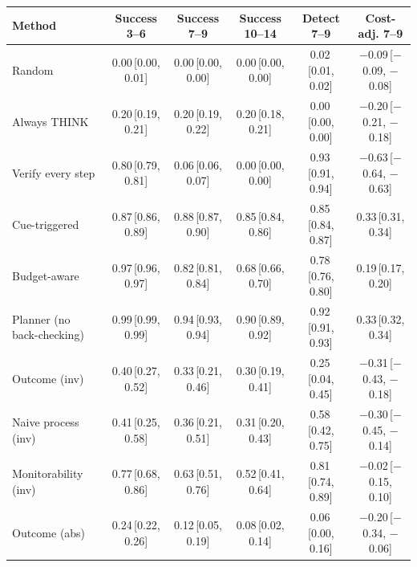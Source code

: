 \begin{tabular}{lccccc}
\toprule
Method & Success 3--6 & Success 7--9 & Success 10--14 & Detect 7--9 & Cost-adj. 7--9 \\
\midrule
Random & 0.00\,{\scriptsize[0.00, 0.01]} & 0.00\,{\scriptsize[0.00, 0.00]} & 0.00\,{\scriptsize[0.00, 0.00]} & 0.02\,{\scriptsize[0.01, 0.02]} & \ensuremath{-}0.09\,{\scriptsize[\ensuremath{-}0.09, \ensuremath{-}0.08]} \\
Always THINK & 0.20\,{\scriptsize[0.19, 0.21]} & 0.20\,{\scriptsize[0.19, 0.22]} & 0.20\,{\scriptsize[0.18, 0.21]} & 0.00\,{\scriptsize[0.00, 0.00]} & \ensuremath{-}0.20\,{\scriptsize[\ensuremath{-}0.21, \ensuremath{-}0.18]} \\
Verify every step & 0.80\,{\scriptsize[0.79, 0.81]} & 0.06\,{\scriptsize[0.06, 0.07]} & 0.00\,{\scriptsize[0.00, 0.00]} & 0.93\,{\scriptsize[0.91, 0.94]} & \ensuremath{-}0.63\,{\scriptsize[\ensuremath{-}0.64, \ensuremath{-}0.63]} \\
Cue-triggered & 0.87\,{\scriptsize[0.86, 0.89]} & 0.88\,{\scriptsize[0.87, 0.90]} & 0.85\,{\scriptsize[0.84, 0.86]} & 0.85\,{\scriptsize[0.84, 0.87]} & 0.33\,{\scriptsize[0.31, 0.34]} \\
Budget-aware & 0.97\,{\scriptsize[0.96, 0.97]} & 0.82\,{\scriptsize[0.81, 0.84]} & 0.68\,{\scriptsize[0.66, 0.70]} & 0.78\,{\scriptsize[0.76, 0.80]} & 0.19\,{\scriptsize[0.17, 0.20]} \\
Planner (no back-checking) & 0.99\,{\scriptsize[0.99, 0.99]} & 0.94\,{\scriptsize[0.93, 0.94]} & 0.90\,{\scriptsize[0.89, 0.92]} & 0.92\,{\scriptsize[0.91, 0.93]} & 0.33\,{\scriptsize[0.32, 0.34]} \\
\midrule
Outcome (inv) & 0.40\,{\scriptsize[0.27, 0.52]} & 0.33\,{\scriptsize[0.21, 0.46]} & 0.30\,{\scriptsize[0.19, 0.41]} & 0.25\,{\scriptsize[0.04, 0.45]} & \ensuremath{-}0.31\,{\scriptsize[\ensuremath{-}0.43, \ensuremath{-}0.18]} \\
Naive process (inv) & 0.41\,{\scriptsize[0.25, 0.58]} & 0.36\,{\scriptsize[0.21, 0.51]} & 0.31\,{\scriptsize[0.20, 0.43]} & 0.58\,{\scriptsize[0.42, 0.75]} & \ensuremath{-}0.30\,{\scriptsize[\ensuremath{-}0.45, \ensuremath{-}0.14]} \\
Monitorability (inv) & 0.77\,{\scriptsize[0.68, 0.86]} & 0.63\,{\scriptsize[0.51, 0.76]} & 0.52\,{\scriptsize[0.41, 0.64]} & 0.81\,{\scriptsize[0.74, 0.89]} & \ensuremath{-}0.02\,{\scriptsize[\ensuremath{-}0.15, 0.10]} \\
Outcome (abs) & 0.24\,{\scriptsize[0.22, 0.26]} & 0.12\,{\scriptsize[0.05, 0.19]} & 0.08\,{\scriptsize[0.02, 0.14]} & 0.06\,{\scriptsize[0.00, 0.16]} & \ensuremath{-}0.20\,{\scriptsize[\ensuremath{-}0.34, \ensuremath{-}0.06]} \\

\end{tabular}
